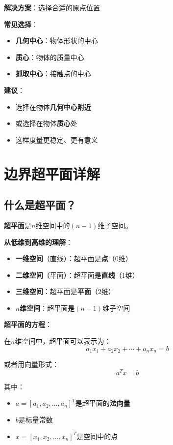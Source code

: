 \documentclass[12pt,a4paper]{article}
\begin{document}
\textbf{解决方案}：选择合适的原点位置

\textbf{常见选择}：
\begin{itemize}
\item \textbf{几何中心}：物体形状的中心
\item \textbf{质心}：物体的质量中心
\item \textbf{抓取中心}：接触点的中心
\end{itemize}

\textbf{建议}：
\begin{itemize}
\item 选择在物体\textbf{几何中心附近}
\item 或选择在物体\textbf{质心}处
\item 这样度量更稳定、更有意义
\end{itemize}

\section{边界超平面详解}

\subsection{什么是超平面？}

\textbf{超平面}是$n$维空间中的$(n-1)$维子空间。

\textbf{从低维到高维的理解}：
\begin{itemize}
\item \textbf{一维空间}（直线）：超平面是\textbf{点}（0维）
\item \textbf{二维空间}（平面）：超平面是\textbf{直线}（1维）
\item \textbf{三维空间}：超平面是\textbf{平面}（2维）
\item \textbf{$n$维空间}：超平面是$(n-1)$维子空间
\end{itemize}

\textbf{超平面的方程}：

在$n$维空间中，超平面可以表示为：
\begin{equation}
a_1 x_1 + a_2 x_2 + \cdots + a_n x_n = b
\label{eq:hyperplane_general}
\end{equation}

或者用向量形式：
\begin{equation}
a^T x = b
\label{eq:hyperplane_vector}
\end{equation}

其中：
\begin{itemize}
\item $a = [a_1, a_2, \ldots, a_n]^T$是超平面的\textbf{法向量}
\item $b$是标量常数
\item $x = [x_1, x_2, \ldots, x_n]^T$是空间中的点
\end{itemize}
\end{document}
